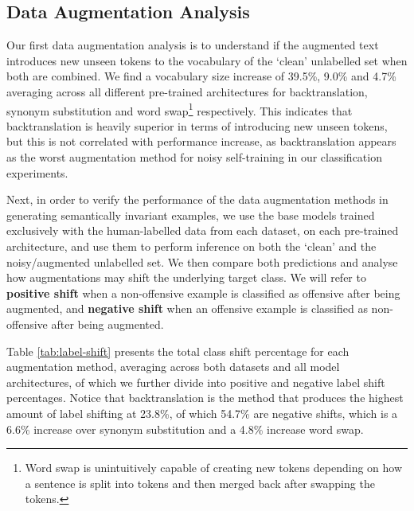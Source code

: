 \documentclass[11pt,a4paper]{article}
\begin{document}
\subsection{Data Augmentation Analysis}
Our first data augmentation analysis is to understand if the augmented text introduces new unseen tokens to the vocabulary of the `clean' unlabelled set when both are combined. We find a vocabulary size increase of 39.5\%, 9.0\% and 4.7\% averaging across all different pre-trained architectures for backtranslation, synonym substitution and word swap\footnote{Word swap is unintuitively capable of creating new tokens depending on how a sentence is split into tokens and then merged back after swapping the tokens.} respectively. This indicates that backtranslation is heavily superior in terms of introducing new unseen tokens, but this is not correlated with performance increase, as backtranslation appears as the worst augmentation method for noisy self-training in our classification experiments.

Next, in order to verify the performance of the data augmentation methods in generating semantically invariant examples, we use the base models trained exclusively with the human-labelled data from each dataset, on each pre-trained architecture, and use them to perform inference on both the `clean' and the noisy/augmented unlabelled set. We then compare both predictions and analyse how augmentations may shift the underlying target class. We will refer to \textbf{positive shift} when a non-offensive example is classified as offensive after being augmented, and \textbf{negative shift} when an offensive example is classified as non-offensive after being augmented.

Table \ref{tab:label-shift} presents the total class shift percentage for each augmentation method, averaging across both datasets and all model architectures, of which we further divide into positive and negative label shift percentages. Notice that backtranslation is the method that produces the highest amount of label shifting at 23.8\%, of which 54.7\% are negative shifts, which is a 6.6\% increase over synonym substitution and a 4.8\% increase word swap.
\end{document}
